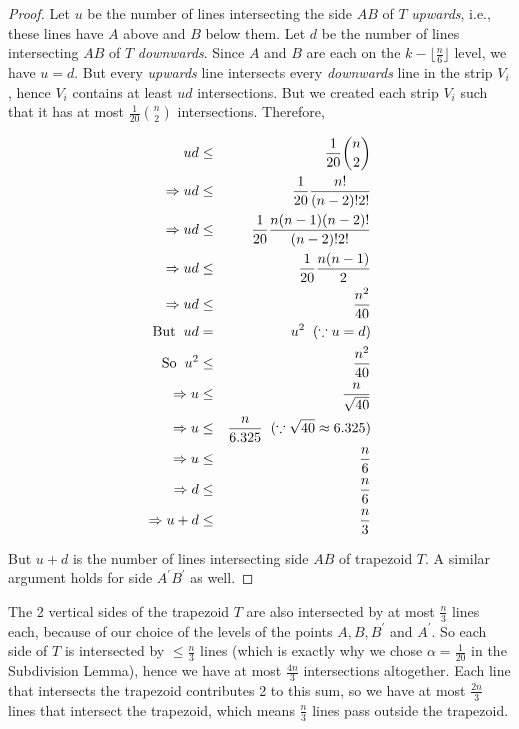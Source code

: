 \documentclass[charterfonts,lotsofwhite]{patmorin}
\begin{document}
\begin{proof}
Let $u$ be the number of lines intersecting the side $AB$ of $T$ \emph{upwards}, i.e., these lines have $A$ above and $B$ below them. Let $d$ be the number of lines intersecting $AB$ of $T$ \emph{downwards}. Since $A$ and $B$ are each on the $k-\lfloor\frac{n}{6}\rfloor$ level, we have $u = d$. But every \emph{upwards} line intersects every \emph{downwards} line in the strip $V_i$, hence $V_i$ contains at least $ud$ intersections. But we created each strip $V_i$ such that it has at most $\frac{1}{20}{n\choose 2}$ intersections. Therefore, 

\begin{eqnarray*}
            ud & \le & \frac{1}{20} {n \choose 2} \\
\Rightarrow ud & \le & \frac{1}{20} \frac{n!}{(n-2)!2!} \\
\Rightarrow ud & \le & \frac{1}{20} \frac{n(n-1)(n-2)!}{(n-2)!2!} \\
\Rightarrow ud & \le & \frac{1}{20} \frac{n(n-1)}{2} \\
\Rightarrow ud & \le & \frac{n^2}{40} \\
\mbox{But} \hspace{2mm}  ud &  =  & u^2 \hspace{2mm}(\because u = d) \\
\mbox{So}  \hspace{2mm} u^2 & \le & \frac{n^2}{40} \\
\Rightarrow u   & \le & \frac{n}{\sqrt{40}} \\
\Rightarrow u   & \le & \frac{n}{6.325} \hspace{2mm}(\because \sqrt{40} \approx 6.325) \\
\Rightarrow u   & \le & \frac{n}{6} \\
\Rightarrow d   & \le & \frac{n}{6} \\
\Rightarrow u+d & \le & \frac{n}{3} 
\end{eqnarray*}

But $u+d$ is the number of lines intersecting side $AB$ of trapezoid $T$. A similar argument holds for side $A^{\prime}B^{\prime}$ as well.
\end{proof}

The 2 vertical sides of the trapezoid $T$ are also intersected by at most $\frac{n}{3}$ lines each, because of our choice of the levels of the points $A, B, B^{\prime}$ and $A^{\prime}$. So each side of $T$ is intersected by $\le \frac{n}{3}$ lines (which is exactly why we chose $\alpha = \frac{1}{20}$ in the Subdivision Lemma), hence we have at most $\frac{4n}{3}$ intersections altogether. Each line that intersects the trapezoid contributes 2 to this sum, so we have at most $\frac{2n}{3}$ lines that intersect the trapezoid, which means $\frac{n}{3}$ lines pass outside the trapezoid.
\end{document}
